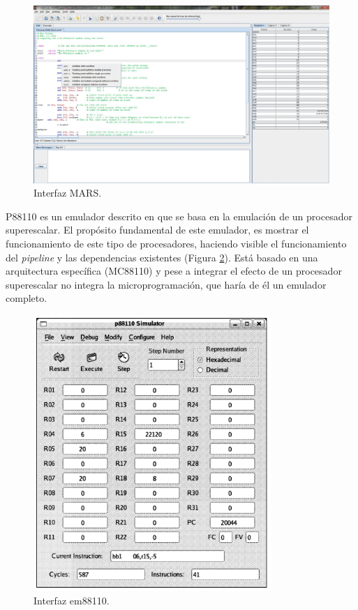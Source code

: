\begin{figure}[htbp]
 	\centering
 	\includegraphics[width=15cm]{figures/mars_figure}
 	\caption{Interfaz MARS.}
	\label{fig:mars_figure}
\end{figure}

P88110 es un emulador descrito en \cite{garcia2009p88110} que se basa en la emulación de un procesador superescalar. El propósito fundamental de este emulador, es mostrar el funcionamiento de este tipo de procesadores, haciendo visible el funcionamiento del \emph{\gls{pipeline}} y las dependencias existentes (Figura \ref{fig:p88110_figure}). Está basado en una arquitectura específica (MC88110) y pese a integrar el efecto de un procesador superescalar no integra la microprogramación, que haría de él un emulador completo.

\begin{figure}[htbp]
 	\centering
 	\includegraphics[width=9cm]{figures/em88110}
 	\caption{Interfaz em88110.}
	\label{fig:p88110_figure}
\end{figure}


